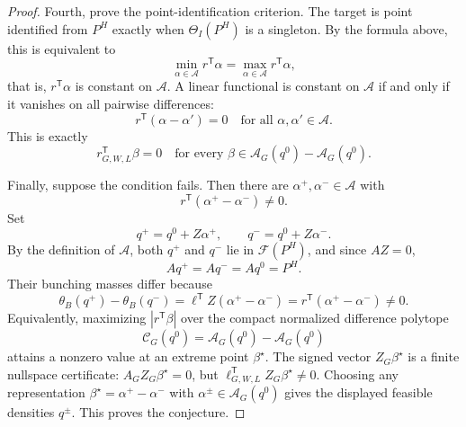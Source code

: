 \documentclass[11pt]{article}
\newcommand{\transpose}{\mathsf{T}}
\theoremstyle{definition}
\theoremstyle{plain}
\theoremstyle{remark}
\begin{document}
\begin{proof}
Fourth, prove the point-identification criterion.  The target is point identified from \(P^H\) exactly when \(\Theta_I(P^H)\) is a singleton.  By the formula above, this is equivalent to
\[
\min_{\alpha\in\mathcal{A}}r^{\transpose}\alpha
=
\max_{\alpha\in\mathcal{A}}r^{\transpose}\alpha,
\]
that is, \(r^{\transpose}\alpha\) is constant on \(\mathcal{A}\).  A linear functional is constant on \(\mathcal{A}\) if and only if it vanishes on all pairwise differences:
\[
r^{\transpose}(\alpha-\alpha')=0
\quad\text{for all }\alpha,\alpha'\in\mathcal{A}.
\]
This is exactly
\[
r_{G,W,L}^{\transpose}\beta=0
\quad\text{for every }\beta\in\mathcal{A}_G(q^0)-\mathcal{A}_G(q^0).
\]

Finally, suppose the condition fails.  Then there are \(\alpha^+,\alpha^-\in\mathcal{A}\) with
\[
r^{\transpose}(\alpha^+-\alpha^-)\ne 0.
\]
Set
\[
q^+=q^0+Z\alpha^+,\qquad q^-=q^0+Z\alpha^-.
\]
By the definition of \(\mathcal{A}\), both \(q^+\) and \(q^-\) lie in \(\mathcal{F}(P^H)\), and since \(AZ=0\),
\[
Aq^+=Aq^-=Aq^0=P^H.
\]
Their bunching masses differ because
\[
\theta_B(q^+)-\theta_B(q^-)
=\ell^{\transpose}Z(\alpha^+-\alpha^-)
=r^{\transpose}(\alpha^+-\alpha^-)
\ne0.
\]
Equivalently, maximizing \(|r^{\transpose}\beta|\) over the compact normalized difference polytope
\[
\mathcal{C}_G(q^0)=\mathcal{A}_G(q^0)-\mathcal{A}_G(q^0)
\]
attains a nonzero value at an extreme point \(\beta^\star\).  The signed vector \(Z_G\beta^\star\) is a finite nullspace certificate: \(A_GZ_G\beta^\star=0\), but \(\ell_{G,W,L}^{\transpose}Z_G\beta^\star\ne0\).  Choosing any representation \(\beta^\star=\alpha^+-\alpha^-\) with \(\alpha^\pm\in\mathcal{A}_G(q^0)\) gives the displayed feasible densities \(q^\pm\).  This proves the conjecture.
\end{proof}
\end{document}
